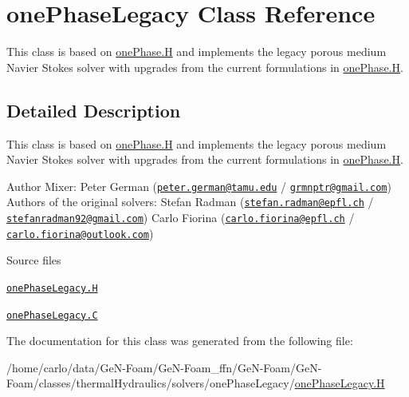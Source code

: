\hypertarget{classFoam_1_1onePhaseLegacy}{}\section{one\+Phase\+Legacy Class Reference}
\label{classFoam_1_1onePhaseLegacy}


This class is based on \hyperlink{onePhase_8H}{one\+Phase.\+H} and implements the legacy porous medium Navier Stokes solver with upgrades from the current formulations in \hyperlink{onePhase_8H}{one\+Phase.\+H}.  




\subsection{Detailed Description}
This class is based on \hyperlink{onePhase_8H}{one\+Phase.\+H} and implements the legacy porous medium Navier Stokes solver with upgrades from the current formulations in \hyperlink{onePhase_8H}{one\+Phase.\+H}. 

\label{_Description}%
 Author Mixer\+: Peter German (\href{mailto:peter.german@tamu.edu}{\tt peter.\+german@tamu.\+edu} / \href{mailto:grmnptr@gmail.com}{\tt grmnptr@gmail.\+com}) Authors of the original solvers\+: Stefan Radman (\href{mailto:stefan.radman@epfl.ch}{\tt stefan.\+radman@epfl.\+ch} / \href{mailto:stefanradman92@gmail.com}{\tt stefanradman92@gmail.\+com}) Carlo Fiorina (\href{mailto:carlo.fiorina@epfl.ch}{\tt carlo.\+fiorina@epfl.\+ch} / \href{mailto:carlo.fiorina@outlook.com}{\tt carlo.\+fiorina@outlook.\+com})

\begin{DoxyParagraph}{Source files}

\begin{DoxyItemize}
\item \href{../../../home/carlo/data/GeN-Foam/GeN-Foam_ffn/GeN-Foam/GeN-Foam/classes/thermalHydraulics/solvers/onePhaseLegacy/onePhaseLegacy.H}{\tt one\+Phase\+Legacy.\+H} 
\item \href{../../../home/carlo/data/GeN-Foam/GeN-Foam_ffn/GeN-Foam/GeN-Foam/classes/thermalHydraulics/solvers/onePhaseLegacy/onePhaseLegacy.C}{\tt one\+Phase\+Legacy.\+C} 
\end{DoxyItemize}
\end{DoxyParagraph}


The documentation for this class was generated from the following file\+:\begin{DoxyCompactItemize}
\item 
/home/carlo/data/\+Ge\+N-\/\+Foam/\+Ge\+N-\/\+Foam\+\_\+ffn/\+Ge\+N-\/\+Foam/\+Ge\+N-\/\+Foam/classes/thermal\+Hydraulics/solvers/one\+Phase\+Legacy/\hyperlink{onePhaseLegacy_8H}{one\+Phase\+Legacy.\+H}\end{DoxyCompactItemize}
